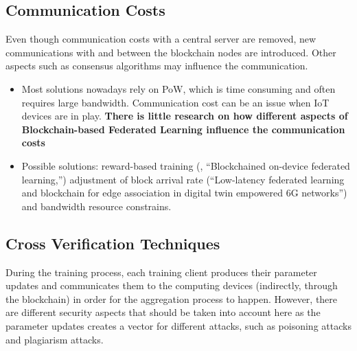 \subsection{Communication Costs}


Even though communication costs with a central server are removed, new communications with and between the blockchain nodes are introduced. Other aspects such as consensus algorithms may influence the communication.

\begin{itemize}
    \item Most solutions nowadays rely on PoW, which is time consuming and often requires large bandwidth. Communication cost can be an issue when IoT devices are in play. \textbf{There is little research on how different aspects of Blockchain-based Federated Learning influence the communication costs} \cite{9403374}
    
    \item Possible solutions: reward-based training (\cite{9079513}, “Blockchained on-device federated learning,”) adjustment of block arrival rate (“Low-latency federated learning and blockchain for edge association in digital twin empowered 6G networks”) and bandwidth resource constrains.
\end{itemize}

\subsection{Cross Verification Techniques}


During the training process, each training client produces their parameter updates and communicates them to the computing devices (indirectly, through the blockchain) in order for the aggregation process to happen. However, there are different security aspects that should be taken into account here as the parameter updates creates a vector for different attacks, such as poisoning attacks and plagiarism attacks.

